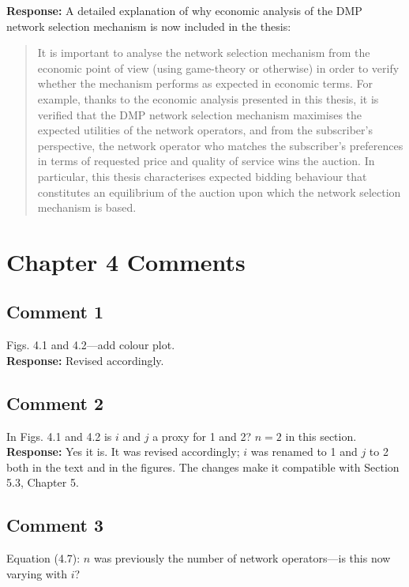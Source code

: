 \documentclass[10pt,a4paper,notitlepage]{article}
\numberwithin{equation}{section}
\begin{document}
\textbf{Response:}
A detailed explanation of why economic analysis of the DMP network selection mechanism is now included in the thesis:
\begin{quote}
It is important to analyse the network selection mechanism from the economic point of view (using game-theory or otherwise) in order to verify whether the mechanism performs as expected in economic terms. For example, thanks to the economic analysis presented in this thesis, it is verified that the DMP network selection mechanism maximises the expected utilities of the network operators, and from the subscriber's perspective, the network operator who matches the subscriber's preferences in terms of requested price and quality of service wins the auction. In particular, this thesis characterises expected bidding behaviour that constitutes an equilibrium of the auction upon which the network selection mechanism is based.
\end{quote}

\clearpage

\section{Chapter 4 Comments}
\subsection{Comment 1}
Figs. 4.1 and 4.2---add colour plot.\\[-2ex]

\textbf{Response:}
Revised accordingly.

\subsection{Comment 2}
In Figs. 4.1 and 4.2 is $i$ and $j$ a proxy for 1 and 2? $n=2$ in this section.\\[-2ex]

\textbf{Response:}
Yes it is. It was revised accordingly; $i$ was renamed to 1 and $j$ to 2 both in the text and in the figures. The changes make it compatible with Section 5.3, Chapter 5.

\subsection{Comment 3}
Equation (4.7): $n$ was previously the number of network operators---is this now varying with $i$?\\[-2ex]
\end{document}
